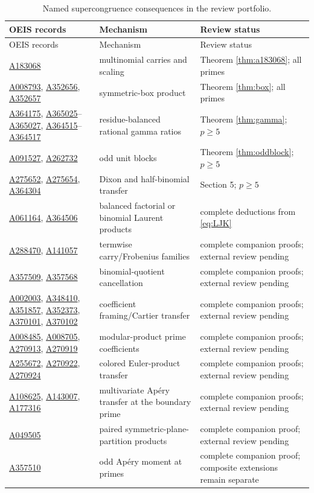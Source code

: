 \documentclass[11pt]{article}
\theoremstyle{definition}
\newcommand{\OEIS}[1]{\href{https://oeis.org/#1}{#1}}
\begin{document}
\small
\begin{longtable}{>{\raggedright\arraybackslash}p{}
                  >{\raggedright\arraybackslash}p{}
                  >{\raggedright\arraybackslash}p{}}
\caption{Named supercongruence consequences in the review portfolio.}
\label{tab:ledger}\\
\toprule
OEIS records & Mechanism & Review status \\
\midrule
\endfirsthead
\toprule
OEIS records & Mechanism & Review status \\
\midrule
\endhead
\OEIS{A183068} & multinomial carries and scaling & Theorem \ref{thm:a183068}; all primes \\
\OEIS{A008793}, \OEIS{A352656}, \OEIS{A352657} & symmetric-box product & Theorem \ref{thm:box}; all primes \\
\OEIS{A364175}, \OEIS{A365025}--\OEIS{A365027},
\OEIS{A364515}--\OEIS{A364517} & residue-balanced rational gamma ratios & Theorem \ref{thm:gamma}; $p\geq5$ \\
\OEIS{A091527}, \OEIS{A262732} & odd unit blocks & Theorem \ref{thm:oddblock}; $p\geq5$ \\
\OEIS{A275652}, \OEIS{A275654}, \OEIS{A364304} & Dixon and half-binomial transfer & Section 5; $p\geq5$ \\
\OEIS{A061164}, \OEIS{A364506} & balanced factorial or binomial Laurent products & complete deductions from \eqref{eq:LJK} \\
\OEIS{A288470}, \OEIS{A141057} & termwise carry/Frobenius families & complete companion proofs; external review pending \\
\OEIS{A357509}, \OEIS{A357568} & binomial-quotient cancellation & complete companion proofs; external review pending \\
\OEIS{A002003}, \OEIS{A348410}, \OEIS{A351857},
\OEIS{A352373}, \OEIS{A370101}, \OEIS{A370102} & coefficient framing/Cartier transfer & complete companion proofs; external review pending \\
\OEIS{A008485}, \OEIS{A008705}, \OEIS{A270913}, \OEIS{A270919} & modular-product prime coefficients & complete companion proofs; external review pending \\
\OEIS{A255672}, \OEIS{A270922}, \OEIS{A270924} & colored Euler-product transfer & complete companion proofs; external review pending \\
\OEIS{A108625}, \OEIS{A143007}, \OEIS{A177316} & multivariate Ap\'ery transfer at the boundary prime & complete companion proofs; external review pending \\
\OEIS{A049505} & paired symmetric-plane-partition products & complete companion proof; external review pending \\
\OEIS{A357510} & odd Ap\'ery moment at primes & complete companion proof; composite extensions remain separate \\
\bottomrule
\end{longtable}
\normalsize
\end{document}
